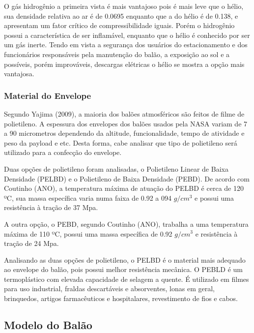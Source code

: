 	O gás hidrogênio a primeira vista é mais vantajoso pois é mais leve que o hélio, sua densidade relativa ao ar é de 0.0695 enquanto que a do hélio é de 0.138, e apresentam um fator crítico de compressibilidade iguais. Porém o hidrogênio possui a característica de ser inflamável, enquanto que o hélio é conhecido por ser um gás inerte. Tendo em vista a segurança dos usuários do estacionamento e dos funcionários responsáveis pela manutenção do balão, a exposição ao sol e a possíveis, porém improváveis,  descargas elétricas o hélio se mostra a opção mais vantajosa.

	\subsubsection{Material do Envelope}

	Segundo Yajima (2009), a maioria dos balões atmosféricos são feitos de filme de polietileno. A espessura dos envelopes dos balões usados pela NASA variam de 7 a 90 micrometros dependendo da altitude, funcionalidade, tempo de atividade e peso da payload e etc. Desta forma, cabe analisar que tipo de polietileno será utilizado para a confecção do envelope.
	
	Duas opções de polietileno foram analisadas, o Polietileno Linear de Baixa Densidade (PELBD) e o Polietileno de Baixa Densidade (PEBD). De acordo com Coutinho (ANO), a temperatura máxima de atuação do PELBD é cerca de 120 ºC, sua massa específica varia numa faixa de 0.92 a 094 $g/cm^3$ e possui uma resistência à tração de 37 Mpa.

	A outra opção, o PEBD, segundo Coutinho (ANO), trabalha a uma temperatura máxima de 110 ºC, possui uma massa específica de 0.92 $g/cm^3$ e resistência à tração de 24 Mpa.
	
	Analisando as duas opções de polietileno, o PELBD é o material mais adequado ao envelope do balão, pois possui melhor resistência mecânica. O PEBLD é um termoplástico com elevada capacidade de selagem a quente. É utilizado em filmes para uso industrial, fraldas descartáveis e absorventes, lonas em geral, brinquedos, artigos farmacêuticos e hospitalares, revestimento de fios e cabos.


\subsection{Modelo do Balão} %
\label{sub:modelo_do_bal_o}

